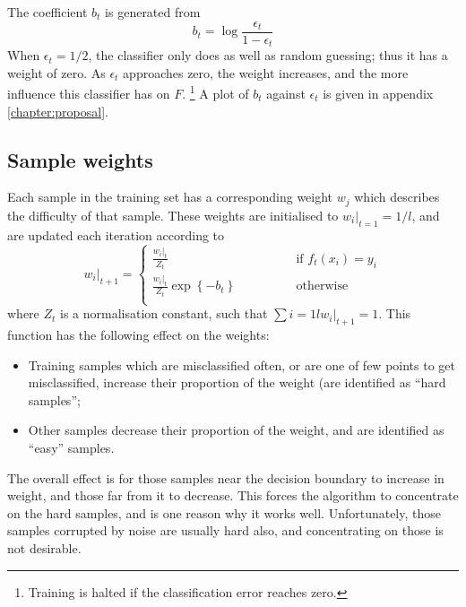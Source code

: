 The coefficient $b_t$ is generated from
%
\begin{equation}
b_t = \log \frac{\epsilon_t}{1 - \epsilon_t}
\label{eqn:bt}
\end{equation}
%
When $\epsilon_t = 1/2$, the classifier only does as
well as random guessing; thus it has a weight of zero.  As
$\epsilon_t$ approaches zero, the weight increases, and
the more influence this classifier has on $F$.
\footnote{Training is halted if the classification error reaches
zero.}  A plot of $b_t$ against $\epsilon_t$ is given in appendix
\ref{chapter:proposal}.


\subsection{Sample weights}
\label{sec:sample weights}

Each sample in the training set has a corresponding weight $w_j$ which
describes the difficulty of that sample.  These weights are
initialised to $w_i|_{t=1} = 1/l$, and are updated each iteration
according to
%
\begin{equation}
w_i|_{t+1} = \left\{
\begin{array}{ll}
	\frac{w_i|_t}{Z_t}	&	\qquad \qquad \mbox{if
	$f_t(x_i) = y_i$} \\
	\frac{w_i|_t}{Z_t} \exp \left\{ -b_t \right\} & \qquad \qquad
	\mbox{otherwise} \\
\end{array} \right.
\label{eqn:sample weight update}
\end{equation}
%
where $Z_t$ is a normalisation constant, such that
$\sum{i=1}{l} w_i|_{t+1} = 1$.  This function has the following effect
on the weights:

\begin{itemize}

\item	Training samples which are misclassified often, or are one of 
	few points to get misclassified, increase their proportion of
	the weight (are identified as ``hard samples'';

\item	Other samples decrease their proportion of the weight, and are
	identified as ``easy'' samples.

\end{itemize}

The overall effect is for those samples near the decision boundary to
increase in weight, and those far from it to decrease.  This forces
the algorithm to concentrate on the hard samples, and is one reason
why it works well.  Unfortunately, those samples corrupted by noise
are usually hard also, and concentrating on those is not desirable.


